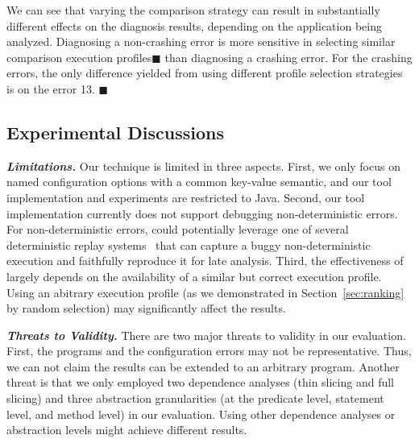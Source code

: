 We can see that varying the comparison strategy can result in
substantially different effects on the diagnosis results,
depending on the application being analyzed. Diagnosing
a non-crashing error is more sensitive in selecting similar
comparison execution profiles$\blacksquare$ than diagnosing
a crashing error.
For the \crash crashing errors, the only difference yielded
from using different profile selection strategies is on
the error 13. $\blacksquare$




\subsection{Experimental Discussions}


\noindent \textbf{\textit{Limitations.}} 
Our technique is limited in three aspects.
First, we only focus on named configuration options
with a common key-value semantic, and our tool implementation
and experiments are
restricted to Java. 
Second,  our tool implementation currently does not
support debugging non-deterministic errors. 
For non-deterministic errors, \ourtool could potentially leverage one of
several deterministic replay systems~\cite{Huang:2010:LLD}
that can capture a buggy non-deterministic
execution and faithfully reproduce it for late analysis.
Third, the effectiveness of \ourtool largely
depends on the availability of a similar but correct execution profile.
Using an abitrary execution profile (as we demonstrated in Section~\ref{sec:ranking}
by random selection) may significantly affect the results.







\vspace{1mm}

\noindent \textbf{\textit{Threats to Validity.}} 
There are two major threats to validity in our evaluation. 
First, the \subjectnum programs and the configuration errors may not be
representative. Thus, we can not claim the results can be
extended to an arbitrary program.
Another threat is that we only employed two dependence
analyses (thin slicing and full slicing) and three
abstraction granularities (at the predicate level,
statement level, and method level) in our evaluation.
 Using other dependence analyses or abstraction levels
might achieve different results.



